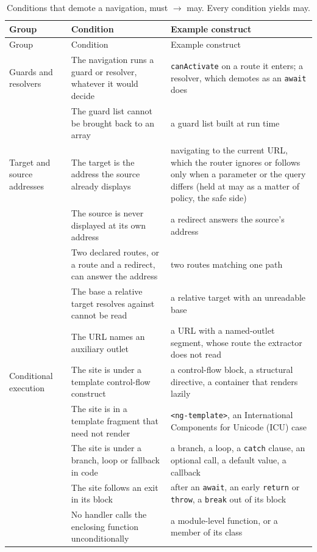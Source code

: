 {\footnotesize
\begin{xltabular}{\textwidth}{@{}>{\raggedright\arraybackslash}p{0.17\textwidth}>{\raggedright\arraybackslash}X>{\raggedright\arraybackslash}X@{}}
\caption{Conditions that demote a navigation, must $\to$ may. Every condition yields may.}
\label{tab:demotion}\\
\toprule
Group & Condition & Example construct \\
\midrule
\endfirsthead
\toprule
Group & Condition & Example construct \\
\midrule
\endhead
Guards and resolvers & The navigation runs a guard or resolver, whatever it would decide &
\texttt{canActivate} on a route it enters; a resolver, which demotes as an \texttt{await} does \\
& The guard list cannot be brought back to an array & a guard list built at run time \\
\midrule
Target and source addresses & The target is the address the source already displays & navigating to the current
URL, which the router ignores or follows only when a parameter or the query differs (held at may as a matter of policy, the safe side) \\
& The source is never displayed at its own address & a redirect answers the source's address \\
& Two declared routes, or a route and a redirect, can answer the address & two routes matching one path \\
& The base a relative target resolves against cannot be read & a relative target with an unreadable base \\
& The URL names an auxiliary outlet & a URL with a named-outlet segment, whose route the extractor does not read \\
\midrule
Conditional execution & The site is under a template control-flow construct & a control-flow block, a structural directive, a container that renders lazily \\
& The site is in a template fragment that need not render & \texttt{<ng-template>}, an International Components for Unicode (ICU) case \\
& The site is under a branch, loop or fallback in code & a branch, a loop, a \texttt{catch} clause, an optional call, a default value, a callback \\
& The site follows an exit in its block & after an \texttt{await}, an early \texttt{return} or \texttt{throw}, a \texttt{break} out of its block \\
& No handler calls the enclosing function unconditionally & a module-level function, or a member of its class \\

\end{xltabular}}
